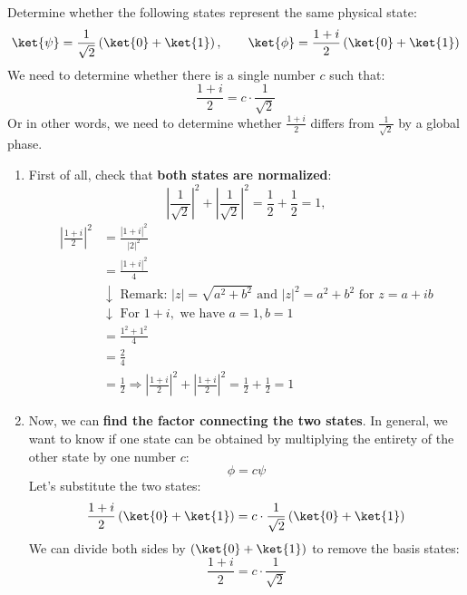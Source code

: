 \highspace
\exercise Determine whether the following states represent the same physical state:
\begin{equation*}
    \ket{\psi} = \frac{1}{\sqrt{2}} \left(\ket{0} + \ket{1}\right), \qquad \ket{\phi} = \frac{1+i}{2} \left(\ket{0} + \ket{1}\right)
\end{equation*}
\solution We need to determine whether there is a single number $c$ such that:
\begin{equation*}
    \frac{1+i}{2} = c \cdot \frac{1}{\sqrt{2}}
\end{equation*}
Or in other words, we need to determine whether $\frac{1+i}{2}$ differs from $\frac{1}{\sqrt{2}}$ by a global phase.
\begin{enumerate}
    \item First of all, check that \textbf{both states are normalized}:
    \begin{equation*}
        \left|\frac{1}{\sqrt{2}}\right|^2 + \left|\frac{1}{\sqrt{2}}\right|^2 = \frac{1}{2} + \frac{1}{2} = 1,
    \end{equation*}
    \begin{equation*}
        \begin{aligned}
            \left|\frac{1+i}{2}\right|^2 &= \frac{\left|1+i\right|^{2}}{\left|2\right|^{2}} \\
            &= \frac{\left|1+i\right|^{2}}{4} \\
            &\downarrow \text{ Remark: } \left|z\right| = \sqrt{a^2 + b^2} \text{ and } \left|z\right|^{2} = a^2 + b^2 \text{ for } z = a + ib \\
            &\downarrow \text{ For } 1+i, \text{ we have } a = 1, b = 1 \\
            &= \frac{1^2 + 1^2}{4} \\
            &= \frac{2}{4} \\
            &= \frac{1}{2} \Rightarrow \left|\frac{1+i}{2}\right|^2 + \left|\frac{1+i}{2}\right|^2 = \frac{1}{2} + \frac{1}{2} = 1
        \end{aligned}
    \end{equation*}

    
    \item Now, we can \textbf{find the factor connecting the two states}. In general, we want to know if one state can be obtained by multiplying the entirety of the other state by one number $c$:
    \begin{equation*}
        \phi = c \psi
    \end{equation*}
    Let's substitute the two states:
    \begin{equation*}
        \frac{1+i}{2} \left(\ket{0} + \ket{1}\right) = c \cdot \frac{1}{\sqrt{2}} \left(\ket{0} + \ket{1}\right)
    \end{equation*}
    We can divide both sides by $\left(\ket{0} + \ket{1}\right)$ to remove the basis states:
    \begin{equation*}
        \frac{1+i}{2} = c \cdot \frac{1}{\sqrt{2}}
    \end{equation*}



\end{enumerate}
